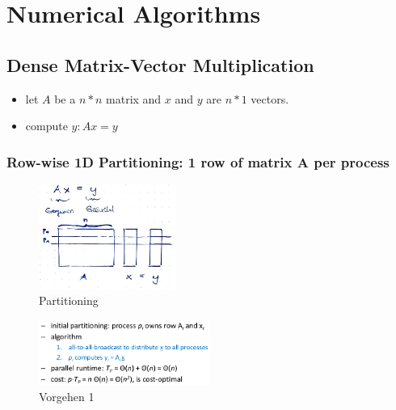 \hypertarget{numerical-algorithms}{%
\section{Numerical Algorithms}\label{numerical-algorithms}}

\hypertarget{dense-matrix-vector-multiplication}{%
\subsection{Dense Matrix-Vector
Multiplication}\label{dense-matrix-vector-multiplication}}

\begin{itemize}
\tightlist
\item let $A$ be a $n*n$ matrix and $x$ and $y$ are $n*1$ vectors.
\item compute $y: Ax = y$
\end{itemize}

\hypertarget{row-wise-1d-partitioning-1-row-of-matrix-a-per-process}{%
\subsubsection{Row-wise 1D Partitioning: 1 row of matrix A per
process}\label{row-wise-1d-partitioning-1-row-of-matrix-a-per-process}}

\begin{figure}[H]
\centering
\includegraphics[width=0.4\textwidth]{figures/matrix-mult-partitioning.png}
\caption{Partitioning}
\end{figure}

\begin{figure}[H]
\centering
\includegraphics[width=0.5\textwidth]{figures/matrixVectorMulitplication1.png}
\caption{Vorgehen 1}
\end{figure}

